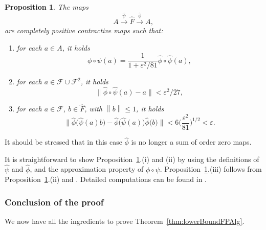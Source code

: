 \documentclass[a4paper]{amsart}
\numberwithin{equation}{section}
\newcommand{\Fcal}{\mathcal{F}}
\newcommand{\e}{\varepsilon}
\newcommand{\norm}[1]{{\left\lVert #1 \right \rVert}}
\newcommand{\normBig}[1]{{\Big\lVert #1 \Big \rVert}}
\theoremstyle{plain}
\newtheorem{propo}[thm]{Proposition}
\theoremstyle{indented}
\numberwithin{equation}{section}
\theoremstyle{definition}
\theoremstyle{remark}
\theoremstyle{plain}
\theoremstyle{definition}
\begin{document}
    \begin{propo}  \label{prop:capCpcMaps}
    The  maps 
    \[ A \overset{\widehat{\psi}}{\longrightarrow} \widehat{F} \overset{\widehat{\phi}}{\longrightarrow} A,\]
    are
    completely positive contractive maps
    such that:
        \begin{enumerate} \renewcommand{\labelenumi}{(\roman{enumi})}
            \item for each $a \in A$, it holds
            \begin{equation*}
             \phi \circ \psi (a) = \frac{1}{1+\e^2/81} \widehat{\phi} \circ \widehat{\psi} (a),
            \end{equation*}
            \item 
                 for each $a \in \Fcal \cup \Fcal^2$, it holds
            \begin{equation*}
        \normBig{\widehat{\phi} \circ \widehat{\psi}(a) - a} < \e^2/27,
    \end{equation*}
            \item for each $a \in \Fcal$, $b \in \widehat{F}$, with $\norm{b} \le 1$, it holds
            \begin{equation*} \label{ineq:capCpcMapsBound}
        \normBig{ \widehat{\phi} \big( \widehat{\psi}(a) b \big) - \widehat{\phi}\big(\widehat{\psi}(a)\big) \widehat{\phi}\big(b\big)} 
        < 6 \Big(\frac{\e^2}{81}\Big)^{1/2}  < \e.
    \end{equation*}
        \end{enumerate}
    \end{propo}

    It should be stressed that in this case $\widehat{\phi}$ is no longer a sum of order zero maps. 

   It is straightforward to show Proposition~\ref{prop:capCpcMaps}.(i) and (ii) by 
   using the definitions of ${\widehat{\psi}}$ and ${\widehat{\phi}}$, and the approximation property of ${\phi \circ \psi}$.
   Proposition~\ref{prop:capCpcMaps}.(iii) follows from Proposition~\ref{prop:capCpcMaps}.(ii) 
   and \cite[Lemma~3.5]{KirchbergWinter2004CoveringDimQuasidiagonality}. 
   Detailed computations can be found in \cite[Lemma~4.9]{Kitsios2025PhDThesis}.


    \smallskip
    \subsubsection{Conclusion of the proof}
    We now have all the ingredients to prove Theorem~\ref{thm:lowerBoundFPAlg}.
\end{document}

